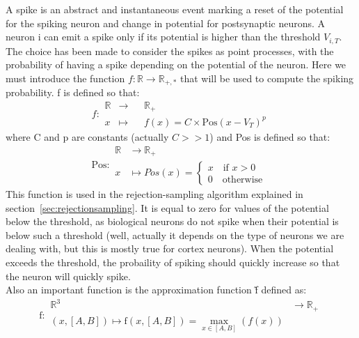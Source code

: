\documentclass{article}
\begin{document}
		A spike is an abstract and instantaneous event marking a reset of the potential for the spiking neuron and change in potential for postsynaptic neurons. A neuron i can emit a spike only if its potential is higher than the threshold $V_{i,T}$. The choice has been made to consider the spikes as point processes, with the probability of having a spike depending on the potential of the neuron. Here we must introduce the function $f:\mathbb{R}\to\mathbb{R}_{+,*}$ that will be used to compute the spiking probability. f is defined so that:\\\indent
		\begin{equation*}
			f:	\begin{aligned}
					\mathbb{R}&\to&&\mathbb{R}_{+}\\
					x&\mapsto&&f(x)=C\times\text{Pos}(x-V_T)^p
				\end{aligned}
		\end{equation*}
		where C and p are constants (actually $C>>1$) and Pos is defined so that:
		\begin{equation*}
			\text{Pos}:	\begin{aligned}
							\mathbb{R}&\to\mathbb{R}_+\\
							x&\mapsto Pos(x)=	\begin{cases}
													x\quad\text{if }x>0\\
													0\quad\text{otherwise}
												\end{cases}
						\end{aligned}
		\end{equation*}
		This function is used in the rejection-sampling algorithm explained in section~\ref{sec:rejectionsampling}. It is equal to zero for values of the potential below the threshold, as biological neurons do not spike when their potential is below such a threshold (well, actually it depends on the type of neurons we are dealing with, but this is mostly true for cortex neurons). When the potential exceeds the threshold, the probaility of spiking should quickly increase so that the neuron will quickly spike.\\\indent
		Also an important function is the approximation function \~f defined as:
		\begin{equation*}
			\text{\~f}:	\begin{aligned}
							\mathbb{R}^3&\to\mathbb{R}_+\\
							(x,[A,B])\mapsto\text{\~f}(x,[A,B])=\max_{x\in[A,B]}(f(x))
						\end{aligned}
		\end{equation*}
\end{document}

